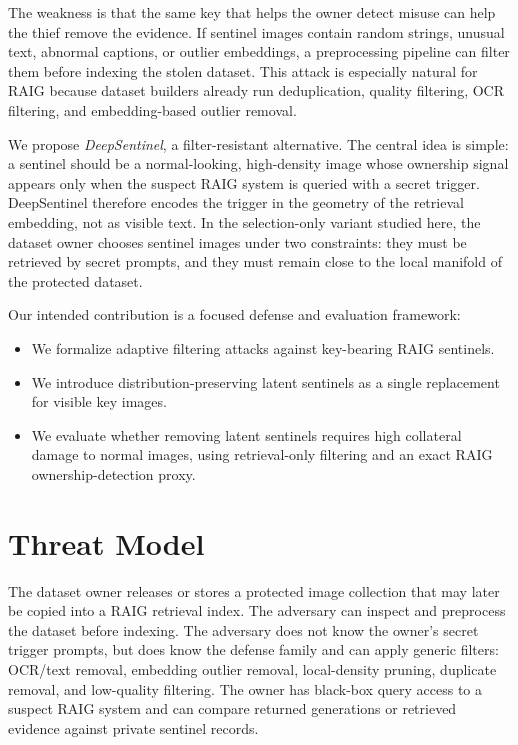 \documentclass[letterpaper,twocolumn,10pt]{article}
\begin{document}
The weakness is that the same key that helps the owner detect misuse can help
the thief remove the evidence. If sentinel images contain random strings,
unusual text, abnormal captions, or outlier embeddings, a preprocessing pipeline
can filter them before indexing the stolen dataset. This attack is especially
natural for RAIG because dataset builders already run deduplication, quality
filtering, OCR filtering, and embedding-based outlier removal.

We propose \emph{DeepSentinel}, a filter-resistant alternative. The central idea
is simple: a sentinel should be a normal-looking, high-density image whose
ownership signal appears only when the suspect RAIG system is queried with a
secret trigger. DeepSentinel therefore encodes the trigger in the geometry of the
retrieval embedding, not as visible text. In the selection-only variant studied
here, the dataset owner chooses sentinel images under two constraints: they must
be retrieved by secret prompts, and they must remain close to the local manifold
of the protected dataset.

Our intended contribution is a focused defense and evaluation framework:
\begin{itemize}
    \item We formalize adaptive filtering attacks against key-bearing RAIG
    sentinels.
    \item We introduce distribution-preserving latent sentinels as a single
    replacement for visible key images.
    \item We evaluate whether removing latent sentinels requires high collateral
    damage to normal images, using retrieval-only filtering and an exact RAIG
    ownership-detection proxy.
\end{itemize}

\section{Threat Model}

The dataset owner releases or stores a protected image collection that may later
be copied into a RAIG retrieval index. The adversary can inspect and preprocess
the dataset before indexing. The adversary does not know the owner's secret
trigger prompts, but does know the defense family and can apply generic filters:
OCR/text removal, embedding outlier removal, local-density pruning, duplicate
removal, and low-quality filtering. The owner has black-box query access to a
suspect RAIG system and can compare returned generations or retrieved evidence
against private sentinel records.
\end{document}
